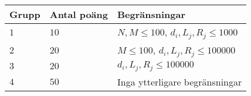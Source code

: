 \noindent
\begin{tabular}{| l | l | p{12cm} |}
  \hline
  \textbf{Grupp} & \textbf{Antal poäng} & \textbf{Begränsningar} \\ \hline
  $1$    & $10$       & $N, M \le 100$, $d_i, L_j, R_j \le 1000$ \\ \hline
  $2$    & $20$       & $M \le 100$, $d_i, L_j, R_j \le 100000$ \\ \hline
  $3$    & $20$       & $d_i, L_j, R_j \le 100000$ \\ \hline
  $4$    & $50$       & Inga ytterligare begränsningar \\ \hline
\end{tabular}
